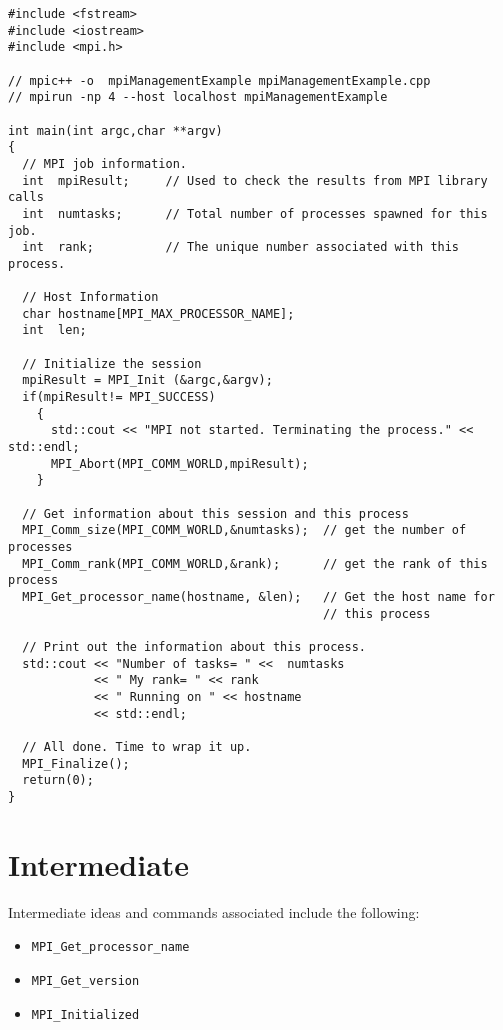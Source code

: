 \lstset{language=C++, numbers=left, numberstyle=\tiny, stepnumber=1,
  numbersep=5pt, commentstyle=\scriptsize}
\begin{lstlisting}[caption={Basic Process Information},
                   basicstyle=\scriptsize,
                   label=listing:basicProcess]
#include <fstream>
#include <iostream>
#include <mpi.h>

// mpic++ -o  mpiManagementExample mpiManagementExample.cpp 
// mpirun -np 4 --host localhost mpiManagementExample

int main(int argc,char **argv)
{
  // MPI job information.
  int  mpiResult;     // Used to check the results from MPI library calls
  int  numtasks;      // Total number of processes spawned for this job.
  int  rank;          // The unique number associated with this process.

  // Host Information 
  char hostname[MPI_MAX_PROCESSOR_NAME];
  int  len;

  // Initialize the session
  mpiResult = MPI_Init (&argc,&argv);
  if(mpiResult!= MPI_SUCCESS)
    {
      std::cout << "MPI not started. Terminating the process." << std::endl;
      MPI_Abort(MPI_COMM_WORLD,mpiResult);
    }

  // Get information about this session and this process 
  MPI_Comm_size(MPI_COMM_WORLD,&numtasks);  // get the number of processes
  MPI_Comm_rank(MPI_COMM_WORLD,&rank);      // get the rank of this process
  MPI_Get_processor_name(hostname, &len);   // Get the host name for
                                            // this process

  // Print out the information about this process.
  std::cout << "Number of tasks= " <<  numtasks
            << " My rank= " << rank
            << " Running on " << hostname
            << std::endl;

  // All done. Time to wrap it up.
  MPI_Finalize();
  return(0);
}
\end{lstlisting}


\section{Intermediate}

\todo Intermediate ideas and commands associated include the following: \\
\begin{itemize}
\item \texttt{MPI\_Get\_processor\_name}
\item \texttt{MPI\_Get\_version}
\item \texttt{MPI\_Initialized}
\end{itemize}

